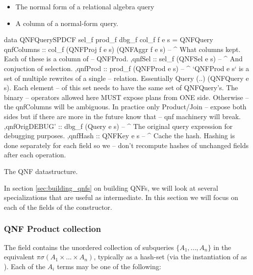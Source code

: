 \begin{itemize}
\item The normal form of a relational algebra query
\item A column of a normal-form query.
\end{itemize}

\begin{code}
  \begin{haskellcode}
    data QNFQuerySPDCF sel_f prod_f dbg_f col_f f e s =
      QNFQuery
      { qnfColumns :: col_f (QNFProj f e s) (QNFAggr f e s)
        -- ^ What columns kept. Each of these is a column of
        -- QNFProd.
        ,qnfSel :: sel_f (QNFSel e s)
        -- ^ And conjuction of selection.
        ,qnfProd :: prod_f (QNFProd e s)
        -- ^ `QNFProd e s` is a set of multiple rewrites of a single
        -- relation. Essentially {Query (..) (QNFQuery e s)}. Each element
        -- of this set needs to have the same set of QNFQuery's. The binary
        -- operators allowed here MUST expose plans from ONE side. Otherwise
        -- the qnfColumns will be ambiguous. In practice only Product/Join
        -- expose both sides but if there are more in the future know that
        -- qnf machinery will break.
        ,qnfOrigDEBUG' :: dbg_f (Query e s)
        -- ^ The original query expression for debugging purposes.
        ,qnfHash :: QNFKey e s
        -- ^ Cache the hash. Hashing is done separately for each field so we
        -- don't recompute hashes of unchanged fields after each operation.
      }
  \end{haskellcode}
  \caption{\label{lst:qnf_struct}The QNF datastructure.}
\end{code}

In section \ref{sec:building_qnfs} on building QNFs,
we will look at several specializations that are useful as intermediate. In this
section we will focus on each of the fields of the 
constructor.

\subsubsection{QNF Product collection}

The  field contains the
unordered collection of subqueries \(\{A_1,... , A_n\}\) in the
equivalent \(\pi \sigma (A_1 \times ... \times A_n)\), typically as a
hash-set (via the instantiation of  as
). Each of the \(A_i\) terms may be one of the following:

